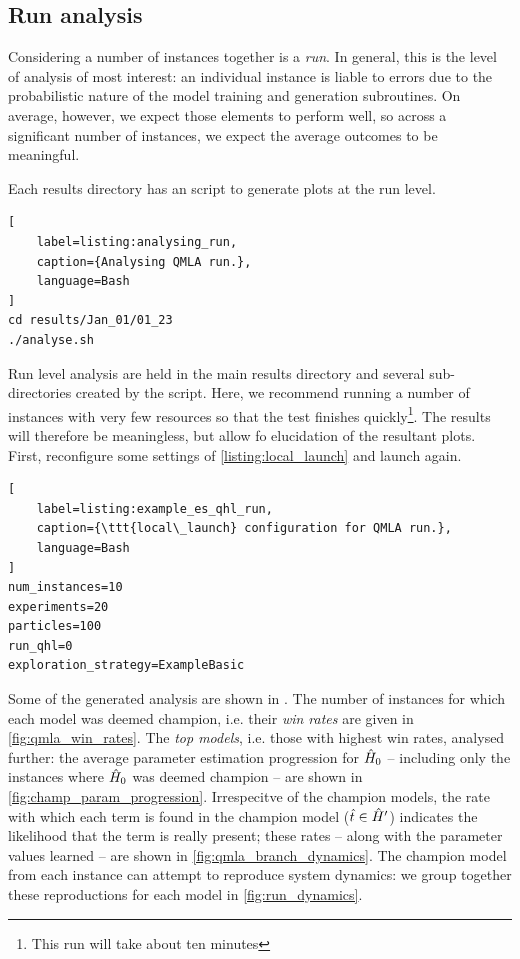 \subsection{Run analysis}
Considering a number of \glspl{instance} together is a \emph{\gls{run}}. 
In general, this is the level of analysis of most interest: 
    an individual instance is liable to errors due to the probabilistic nature of 
    the model training and generation subroutines. 
On average, however, we expect those elements to perform well, 
    so across a significant number of instances, we expect the average outcomes to be meaningful. 
\par 

Each \gls{results directory} has an  script to generate plots at the \gls{run} level. 
\begin{lstlisting}[
    label=listing:analysing_run,
    caption={Analysing QMLA run.},
    language=Bash
]
cd results/Jan_01/01_23
./analyse.sh
\end{lstlisting}

Run level analysis are held in the main \gls{results directory} and several sub-directories created by the  script. 
Here, we recommend running a number of \glspl{instance} with very few resources so that the test finishes quickly\footnote{This \gls{run} will take about ten minutes}. 
The results will therefore be meaningless, but allow fo elucidation of the resultant plots. 
First, reconfigure some settings of \cref{listing:local_launch} and launch again.
\begin{lstlisting}[
    label=listing:example_es_qhl_run,
    caption={\ttt{local\_launch} configuration for QMLA run.},
    language=Bash
]
num_instances=10
experiments=20
particles=100
run_qhl=0
exploration_strategy=ExampleBasic
\end{lstlisting}
\par 

Some of the generated analysis are shown in . 
The number of \glspl{instance} for which each model was deemed \gls{champion}, 
i.e. their \emph{\glspl{win rate}} are given in \cref{fig:qmla_win_rates}.
The \emph{top models}, i.e. those with highest \glspl{win rate}, analysed further: 
    the average parameter estimation progression for $\hat{H}_0$ -- including only the \glspl{instance} where $\hat{H}_0$ was deemed champion --
    are shown in \cref{fig:champ_param_progression}.
Irrespecitve of the \glspl{champion model}, the rate with which each term is found in the \gls{champion model} ($\hat{t} \in \hat{H}^{\prime}$)
    indicates the \gls{likelihood} that the term is really present;
    these rates -- along with the parameter values learned -- are shown in \cref{fig:qmla_branch_dynamics}.
The \gls{champion model} from each \gls{instance} can attempt to reproduce system dynamics: 
    we group together these reproductions for each model in \cref{fig:run_dynamics}. 


